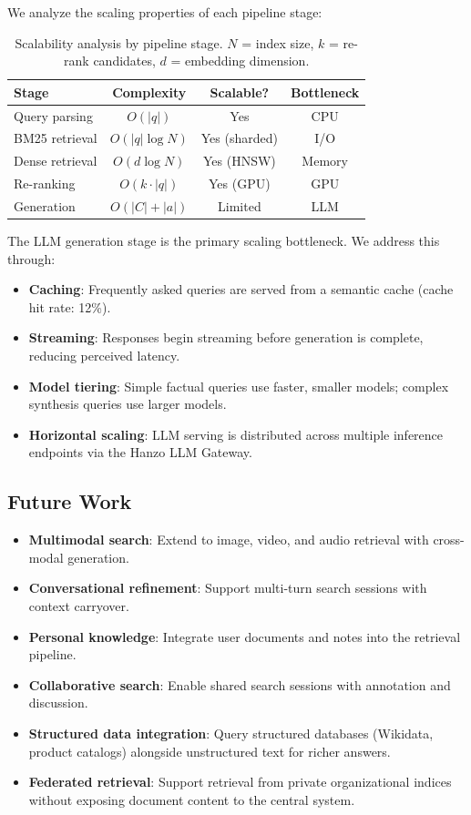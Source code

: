 \documentclass[11pt,twocolumn]{article}
\begin{document}
We analyze the scaling properties of each pipeline stage:

\begin{table}[H]
\centering
\small
\begin{tabular}{lccc}
\toprule
\textbf{Stage} & \textbf{Complexity} & \textbf{Scalable?} & \textbf{Bottleneck} \\
\midrule
Query parsing & $O(|q|)$ & Yes & CPU \\
BM25 retrieval & $O(|q| \log N)$ & Yes (sharded) & I/O \\
Dense retrieval & $O(d \log N)$ & Yes (HNSW) & Memory \\
Re-ranking & $O(k \cdot |q|)$ & Yes (GPU) & GPU \\
Generation & $O(|C| + |a|)$ & Limited & LLM \\
\bottomrule
\end{tabular}
\caption{Scalability analysis by pipeline stage. $N$ = index size, $k$ = re-rank candidates, $d$ = embedding dimension.}
\label{tab:scalability}
\end{table}

The LLM generation stage is the primary scaling bottleneck. We address this through:
\begin{itemize}[leftmargin=1.1em]
    \item \textbf{Caching}: Frequently asked queries are served from a semantic cache (cache hit rate: 12\%).
    \item \textbf{Streaming}: Responses begin streaming before generation is complete, reducing perceived latency.
    \item \textbf{Model tiering}: Simple factual queries use faster, smaller models; complex synthesis queries use larger models.
    \item \textbf{Horizontal scaling}: LLM serving is distributed across multiple inference endpoints via the Hanzo LLM Gateway.
\end{itemize}

\subsection{Future Work}

\begin{itemize}[leftmargin=1.1em]
    \item \textbf{Multimodal search}: Extend to image, video, and audio retrieval with cross-modal generation.
    \item \textbf{Conversational refinement}: Support multi-turn search sessions with context carryover.
    \item \textbf{Personal knowledge}: Integrate user documents and notes into the retrieval pipeline.
    \item \textbf{Collaborative search}: Enable shared search sessions with annotation and discussion.
    \item \textbf{Structured data integration}: Query structured databases (Wikidata, product catalogs) alongside unstructured text for richer answers.
    \item \textbf{Federated retrieval}: Support retrieval from private organizational indices without exposing document content to the central system.
\end{itemize}
\end{document}
